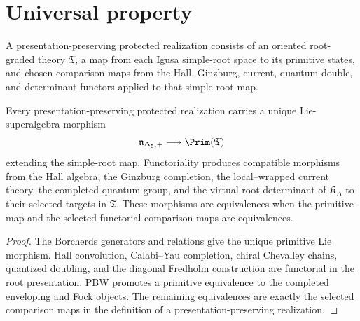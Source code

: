 \chapter{Universal property}
A presentation-preserving protected realization consists of an oriented root-graded theory $\mathfrak T$, a map from each Igusa simple-root space to its primitive states, and chosen comparison maps from the Hall, Ginzburg, current, quantum-double, and determinant functors applied to that simple-root map.

\begin{theorem}
Every presentation-preserving protected realization carries a unique Lie-superalgebra morphism
\[
 \nIg\longrightarrow\Prim(\mathfrak T)
\]
extending the simple-root map.  Functoriality produces compatible morphisms from the Hall algebra, the Ginzburg completion, the local--wrapped current theory, the completed quantum group, and the virtual root determinant of $\mathfrak K_\Delta$ to their selected targets in $\mathfrak T$.  These morphisms are equivalences when the primitive map and the selected functorial comparison maps are equivalences.
\end{theorem}
\begin{proof}
The Borcherds generators and relations give the unique primitive Lie morphism.  Hall convolution, Calabi--Yau completion, chiral Chevalley chains, quantized doubling, and the diagonal Fredholm construction are functorial in the root presentation.  PBW promotes a primitive equivalence to the completed enveloping and Fock objects.  The remaining equivalences are exactly the selected comparison maps in the definition of a presentation-preserving realization.
\end{proof}

